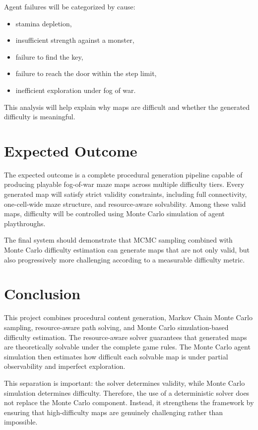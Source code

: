 \documentclass[11pt]{article}
\begin{document}
Agent failures will be categorized by cause:

\begin{itemize}[noitemsep]
    \item stamina depletion,
    \item insufficient strength against a monster,
    \item failure to find the key,
    \item failure to reach the door within the step limit,
    \item inefficient exploration under fog of war.
\end{itemize}

This analysis will help explain why maps are difficult and whether the generated difficulty is meaningful.

\section{Expected Outcome}

The expected outcome is a complete procedural generation pipeline capable of producing playable fog-of-war maze maps across multiple difficulty tiers. Every generated map will satisfy strict validity constraints, including full connectivity, one-cell-wide maze structure, and resource-aware solvability. Among these valid maps, difficulty will be controlled using Monte Carlo simulation of agent playthroughs.

The final system should demonstrate that MCMC sampling combined with Monte Carlo difficulty estimation can generate maps that are not only valid, but also progressively more challenging according to a measurable difficulty metric.

\section{Conclusion}

This project combines procedural content generation, Markov Chain Monte Carlo sampling, resource-aware path solving, and Monte Carlo simulation-based difficulty estimation. The resource-aware solver guarantees that generated maps are theoretically solvable under the complete game rules. The Monte Carlo agent simulation then estimates how difficult each solvable map is under partial observability and imperfect exploration.

This separation is important: the solver determines validity, while Monte Carlo simulation determines difficulty. Therefore, the use of a deterministic solver does not replace the Monte Carlo component. Instead, it strengthens the framework by ensuring that high-difficulty maps are genuinely challenging rather than impossible.
\end{document}
